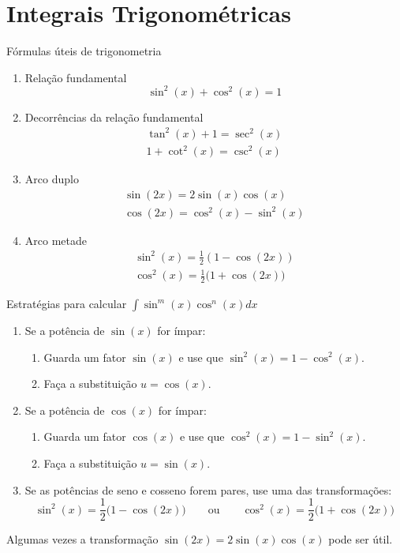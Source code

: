 \section{Integrais Trigonométricas}

Fórmulas úteis de trigonometria
\begin{enumerate}
  \item
    Relação fundamental
    \[
      \sin^2(x)+ \cos^2(x)=1
    \]

  \item
    Decorrências da relação fundamental
    \begin{gather*}
      \tan^2(x)+ 1  = \sec^2(x) \\
      1 + \cot^2(x) = \csc^2(x)
    \end{gather*}

  \item
    Arco duplo
    \begin{gather*}
      \sin(2x) = 2\sin(x) \cos(x) \\
      \cos(2x) = \cos^2(x)-\sin^2(x)
    \end{gather*}
  \item
    Arco metade
    \begin{gather*}
      \sin^2(x)= \frac{1}{2}(1-\cos(2x)) \\
      \cos^2(x)= \frac{1}{2}\big(1+\cos(2x)\big)
    \end{gather*}
\end{enumerate}

Estratégias para calcular \(\int \sin^m(x) \cos^n(x)dx\)
\begin{enumerate}
  \item Se a potência de $\sin(x)$ for ímpar:
    \begin{enumerate}
      \item Guarda um fator $\sin(x)$ e use que $\sin^2(x)=1- \cos^2(x)$.
      \item Faça a substituição $u=\cos(x)$.
    \end{enumerate}

  \item Se a potência de $\cos(x)$ for ímpar:
    \begin{enumerate}
      \item Guarda um fator $\cos(x)$ e use que $\cos^2(x)=1- \sin^2(x)$.
      \item Faça a substituição $u=\sin(x)$.
    \end{enumerate}

  \item Se as potências de seno e cosseno forem pares, use uma das transformações:
    \[
      \sin^2(x)= \frac{1}{2}\big(1-\cos(2x)\big) \qquad\text{ou}\qquad
      \cos^2(x)= \frac{1}{2}\big(1+\cos(2x)\big)
    \]
\end{enumerate}
Algumas vezes a transformação $\sin(2x)=2\sin(x)\cos(x)$ pode ser útil.

